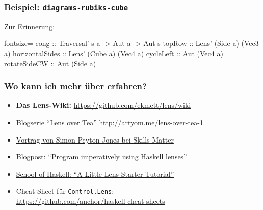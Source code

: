 \documentclass{beamer}
\begin{document}
\begin{frame}[fragile]
  \frametitle{Beispiel: \texttt{diagrams-rubiks-cube}}

  Zur Erinnerung:
  \begin{haskellcode*}{fontsize=\small}
cong :: Traversal' s a -> Aut a -> Aut s
topRow :: Lens' (Side a) (Vec3 a)
horizontalSides :: Lens' (Cube a) (Vec4 a)
cycleLeft :: Aut (Vec4 a)
rotateSideCW :: Aut (Side a)
  \end{haskellcode*}
\end{frame}

\begin{frame}[fragile,t]
  \frametitle{Wo kann ich mehr über  erfahren?}
  \begin{itemize}
    \item \textbf{Das Lens-Wiki:} \url{https://github.com/ekmett/lens/wiki}
    \item Blogserie ``Lens over Tea'' \url{http://artyom.me/lens-over-tea-1}
    \item \href{https://skillsmatter.com/skillscasts/4251-lenses-compositional-data-access-and-manipulation}{Vortrag von Simon Peyton Jones bei Skills Matter}
    \item \href{http://www.haskellforall.com/2013/05/program-imperatively-using-haskell.html}{Blogpost: ``Program imperatively using Haskell lenses''}
    \item \href{https://www.fpcomplete.com/school/to-infinity-and-beyond/pick-of-the-week/a-little-lens-starter-tutorial}{School of Haskell: ``A Little Lens Starter Tutorial''}
    \item Cheat Sheet für \verb|Control.Lens|: \\
    \url{https://github.com/anchor/haskell-cheat-sheets}
  \end{itemize}
\end{frame}
\end{document}
